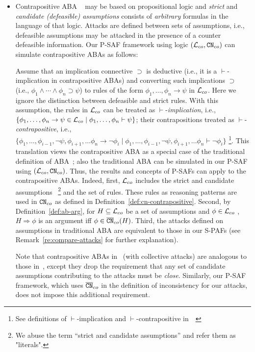 \begin{itemize}
\item  Contrapositive ABA ~\cite{HEYNINCK2020103,ArieliH24} may be based on propositional logic and \emph{strict} and \emph{candidate (defeasible) assumptions} consists of \emph{arbitrary} formulas in the language of that logic. Attacks are defined between sets of assumptions, i.e., defeasible assumptions may be attacked in the presence of a counter defeasible information.
Our P-SAF framework using logic $(\mathcal{L}_{co}, \texttt{\textup{CN}}_{co})$ can simulate contrapositive ABAs as follows:
 
Assume that an implication connective $\supset$ is deductive (i.e., it is a $\vdash$-implication in contrapositive ABAs) and converting such implications $\supset$ (i.e., $\phi_1 \wedge \cdots \wedge \phi_n \supset \psi$) to rules of the form $\phi_1, \ldots, \phi_n \rightarrow \psi$ in $\mathcal{L}_{co}$. Here we ignore the distinction between defeasible and strict rules.
With this assumption, the rules in $\mathcal{L}_{co}$ can be treated as $\vdash$-\emph{implication}, i.e.,$\{ \phi_1, \ldots, \phi_n \rightarrow \psi \in \mathcal{L}_{co} \mid \phi_1, \ldots, \phi_n \vdash \psi \}$; their contrapositions treated as $\vdash$-\emph{contrapositive}, i.e., $\{ \phi_1, \ldots, \phi_{i-1}, \neg \psi, \phi_{i+1}, \dots \phi_n \rightarrow \neg \phi_i \mid \phi_1, \ldots, \phi_{i-1}, \neg \psi, \phi_{i+1}, \dots \phi_n \vdash \neg \phi_i \}$ \footnote{ See definitions of $\vdash$-implication and $\vdash$-contrapositive in~~\cite{HEYNINCK2020103,ArieliH24}}.
This translation views the contrapositive ABA as a special case of the traditional definition of ABA~\cite{Dung2009}; also the traditional ABA can be simulated in our P-SAF using $(\mathcal{L}_{co}, \texttt{\textup{CN}}_{co})$. Thus, the results and concepts of P-SAFs can apply to the contrapositive ABAs.
Indeed, first, $\mathcal{L}_{co}$ includes the strict and candidate assumptions
~\footnote{We abuse the term “strict and candidate assumptions” and refer them as "literals".}
and the set of rules.
These rules as reasoning patterns are used in $\texttt{\textup{CN}}_{co}$ as defined in Definition~\ref{def:cn-contrapositive}.
Second, by Definition~\ref{def:ab-arg}, for $H \subseteq \mathcal{L}_{co}$ be a set of assumptions and $\phi \in \mathcal{L}_{co}$ , $H \Rightarrow \phi$ is an argument iff $\phi \in \overline{\texttt{\textup{CN}}}_{co}(H)$. Third, the attacks defined on assumptions in traditional ABA are equivalent to those in our S-PAFs (see Remark~\ref{re:compare-attacks} for further explanation).

Note that contrapositive ABAs in~\cite{ArieliH24} (with collective attacks) are analogous to those in~\cite{HEYNINCK2020103}, except they drop the requirement that any set of candidate assumptions contributing to the attacks must be \emph{close}. Similarly, our P-SAF framework, which uses $\overline{\texttt{\textup{CN}}}_{co}$ in the definition of inconsistency for our attacks,
does not impose this additional requirement.
\end{itemize}




